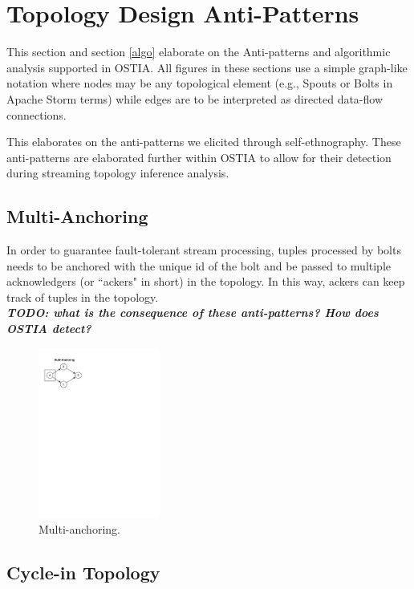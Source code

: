 \section{Topology Design Anti-Patterns}

This section and section \ref{algo} elaborate on the Anti-patterns and algorithmic analysis supported in OSTIA. All figures in these sections use a simple graph-like notation where nodes may be any topological element (e.g., Spouts or Bolts in Apache Storm terms) while edges are to be interpreted as directed data-flow connections.

\label{sec:anti-pattern}
This elaborates on the anti-patterns we elicited through self-ethnography. These anti-patterns are elaborated further within OSTIA to allow for their detection during streaming topology inference analysis.

\subsection{Multi-Anchoring}
In order to guarantee fault-tolerant stream processing, tuples processed by bolts needs to be anchored with the unique id of the bolt and be passed to multiple acknowledgers (or ``ackers" in short) in the topology. In this way, ackers can keep track of tuples in the topology.\\
\emph{\bf TODO: what is the consequence of these anti-patterns? How does OSTIA detect?}

\begin{figure}[H]
	\begin{center}
		\includegraphics[width=4cm]{images/multi-anchoring}
		\caption{Multi-anchoring.}
		\label{fig:multi-anchoring}
	\end{center}
\end{figure}

\subsection{Cycle-in Topology}

